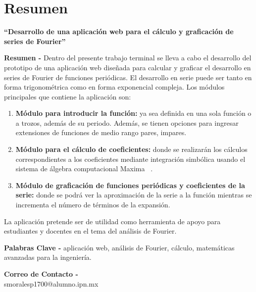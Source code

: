 \chapter{Resumen}
\begin{center}
	\textbf{\Large “Desarrollo de una aplicación web para el cálculo y graficación de series de Fourier”}
	\vspace{0.5cm}
\end{center}

\textbf{Resumen -} Dentro del presente trabajo terminal se lleva a cabo el desarrollo del prototipo de una aplicación web diseñada para calcular y graficar el desarrollo en series de Fourier de funciones periódicas. El desarrollo en serie puede ser tanto en forma trigonométrica como en forma exponencial compleja. Los módulos principales que contiene la aplicación son:

\begin{enumerate}
	\item \textbf{Módulo para introducir la función:} ya sea definida en una sola función o a trozos, además de su periodo. Además, se tienen opciones para ingresar extensiones de funciones de medio rango pares, impares.
	\item \textbf{Módulo para el cálculo de coeficientes:} donde se realizarán los cálculos correspondientes a los coeficientes mediante integración simbólica usando el sistema de álgebra computacional Maxima ~\cite{MaximaSourgeforce}.
	\item \textbf{Módulo de graficación de funciones periódicas y coeficientes de la serie:} donde se podrá ver la aproximación de la serie a la función mientras se incrementa el número de términos de la expansión.
\end{enumerate}

 La aplicación pretende ser de utilidad como herramienta de apoyo para estudiantes y docentes en el tema del análisis de Fourier.

\vspace{0.5cm}

\textbf{Palabras Clave -} aplicación web, análisis de Fourier, cálculo, matemáticas avanzadas para la ingeniería.

\vspace{0.5cm}

\textbf{Correo de Contacto -} \\
smoralesp1700@alumno.ipn.mx \\